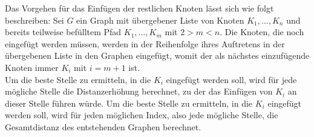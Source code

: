Das Vorgehen für das Einfügen der restlichen Knoten lässt sich wie folgt beschreiben: 
Sei $G$ ein Graph mit übergebener Liste von Knoten  $K_1,\ldots,K_n$ und bereits teilweise befülltem Pfad $K_1,\ldots,K_m$ mit $2 > m < n$.
Die Knoten, die noch eingefügt werden müssen, werden in der Reihenfolge ihres Auftretens in der übergebenen Liste in den Graphen eingefügt, womit der als nächstes einzufügende Knoten immer $K_{i}$ mit $i = m + 1$ ist.
\\
Um die beste Stelle zu ermitteln, in die $K_i$ eingefügt werden soll, wird für jede mögliche Stelle die Distanzerhöhung berechnet, zu der das Einfügen von $K_i$ an dieser Stelle führen würde.
Um die beste Stelle zu ermitteln, in die $K_i$ eingefügt werden soll, wird für jeden möglichen Index, also jede mögliche Stelle, die Gesamtdistanz des entstehenden Graphen berechnet. 


